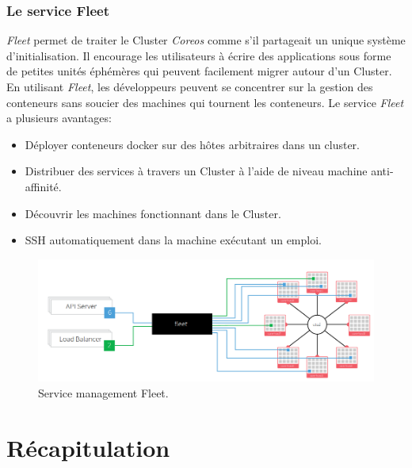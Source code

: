 \begin{onehalfspace}
\subsubsection*{Le service Fleet}
\emph{Fleet} permet de traiter le Cluster \emph{Coreos} comme s'il partageait un unique système d'initialisation. Il encourage les utilisateurs à écrire des applications sous forme de petites unités éphémères qui peuvent facilement migrer autour d'un Cluster. En utilisant \emph{Fleet}, les développeurs peuvent se concentrer sur la gestion des conteneurs sans soucier des machines qui tournent les conteneurs. Le service \emph{Fleet} a plusieurs avantages: 
\begin{itemize}
\item Déployer conteneurs docker sur des hôtes arbitraires dans un cluster.
\item Distribuer des services à travers un Cluster à l'aide de niveau machine anti-affinité.
\item Découvrir les machines fonctionnant dans le Cluster.
\item SSH automatiquement dans la machine exécutant un emploi.
\end{itemize}
\begin{figure}[H]
\centering
\includegraphics [scale=0.5]{chapitre3/assets/fleet.png}
\caption{Service management Fleet.}
\end{figure}
\end{onehalfspace}


\section{Récapitulation}


\def\arraystretch{1.6}%

